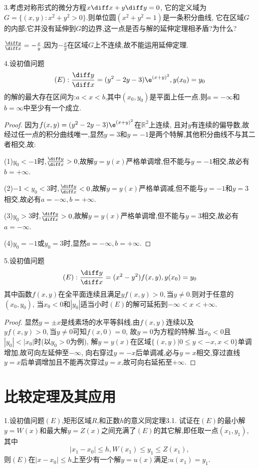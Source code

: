 3.考虑对称形式的微分方程$x\diff x+y\diff y=0$,
它的定义域为$G=\{(x,y):x^2+y^2>0\}$.则单位圆$(x^2+y^2=1)$是一条积分曲线,
它在区域$G$的内部;它并没有延伸到$G$的边界,这一点是否与解的延伸定理相矛盾?为什么?

\begin{solve}
$\frac{\diff y}{\diff x}=-\frac{x}{y}$,因为$-\frac{x}{y}$在区域$G$上不连续,故不能运用延伸定理.
\end{solve}


4.设初值问题
\[(E):\frac{\diff y}{\diff x}=(y^2-2y-3)\e^{(x+y)^2},y(x_0)=y_0\]
的解的最大存在区间为:$a<x<b$,其中$(x_0,y_0)$是平面上任一点.则$a=-\infty$和$b=\infty$中至少有一个成立.

\begin{proof}
因为$f(x,y)=(y^2-2y-3)\e^{(x+y)^2}$在$\mathbb{R}^2$上连续,
且对$y$有连续的偏导数,故经过任一点的积分曲线唯一,显然$y=3$和$y=-1$是两个特解,其他积分曲线不与其二者相交,故:

(1)$y_0<-1$时,$\frac{\diff y}{\diff x}>0$,故解$y=y(x)$严格单调增,但不能与$y=-1$相交,故必有$b=+\infty$.

(2)$-1<y_0<3$时,$\frac{\diff y}{\diff x}<0$,故解$y=y(x)$严格单调减,但不能与$y=-1$和$y=3$相交,故必有$a=-\infty,b=+\infty$.

(3)$y_0>3$时,$\frac{\diff y}{\diff x}>0$,故解$y=y(x)$严格单调增,但不能与$y=3$相交,故必有$a=-\infty$.

(4)$y_0=-1$或$y_0=3$时,显然$a=-\infty,b=+\infty$.
\end{proof}


5.设初值问题
\[(E):\frac{\diff y}{\diff x}=(x^2-y^2)f(x,y),y(x_0)=y_0\]
其中函数$f(x,y)$在全平面连续且满足$yf(x,y)>0,\mbox{当}y\neq0$.则对于任意的$(x_0,y_0)$,
当$x_0<0$和$|y_0|$适当小时$(E)$的解可延拓到$-\infty<x<+\infty$.

\begin{proof}
显然$y=\pm x$是线素场的水平等斜线,由$f(x,y)$连续以及$yf(x,y)>0,\mbox{当}y\neq0$可知$f(x,0)=0$,
故$y=0$为方程的特解.当$x_0<0$且$|y_0|<|x_0|$时(以$y_0>0$为例),
解$y=y(x)$在区域$\{(x,y)|0\leq y<-x,x<0\}$单调增加,故可向左延伸至$-\infty$,
向右穿过$y=-x$后单调减,必与$y=x$相交,穿过直线$y=x$后单调增加且不能再次穿过$y=x$,故可向右延拓至$+\infty$.
\end{proof}


\section{比较定理及其应用}


1.设初值问题$(E)$,矩形区域$R$,和正数$h$的意义同定理3.1.
试证在$(E)$的最小解$y=W(x)$和最大解$y=Z(x)$之间充满了$(E)$的其它解,即任取一点$(x_1,y_1)$,其中
\[|x_1-x_0|\leq h,W(x_1)\leq y_1\leq Z(x_1),\]
则$(E)$在$|x-x_0|\leq h$上至少有一个解$y=u(x)$满足:$u(x_1)=y_1$.

